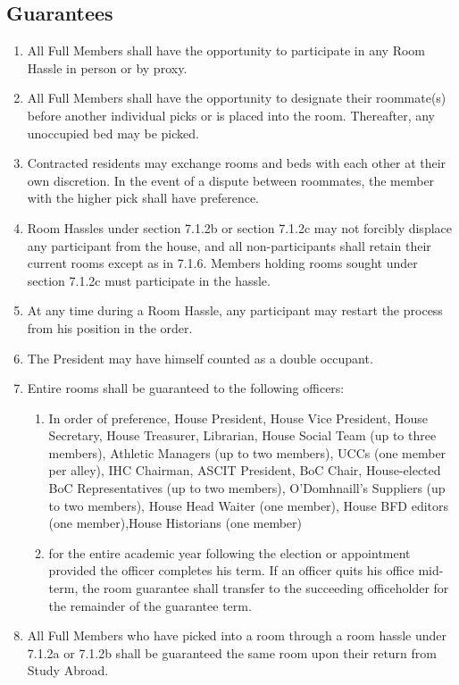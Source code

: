 \documentclass[10pt]{article} %
\begin{document}
\subsection{Guarantees}
\begin{enumerate}
\item All Full Members shall have the opportunity to participate in any Room Hassle in person or by proxy.
\item All Full Members shall have the opportunity to designate their roommate(s) before another individual picks or is placed into the room. Thereafter, any unoccupied bed may be picked.
\item Contracted residents may exchange rooms and beds with each other at their own discretion. In the event of a dispute between roommates, the member with the higher pick shall have preference.
\item Room Hassles under section 7.1.2b or section 7.1.2c may not forcibly displace any participant from the house, and all non-participants shall retain their current rooms except as in 7.1.6. Members holding rooms sought under section 7.1.2c must participate in the hassle.
\item At any time during a Room Hassle, any participant may restart the process from his position in the order.
\item The President may have himself counted as a double occupant.
\item Entire rooms shall be guaranteed to the following officers:
\begin{enumerate}
\item In order of preference, House President, House Vice President, House Secretary, House Treasurer, Librarian, House Social Team (up to three members), Athletic Managers (up to two members), UCCs (one member per alley), IHC Chairman, ASCIT President, BoC Chair, House-elected BoC Representatives (up to two members), O’Domhnaill’s Suppliers (up to two members), House Head Waiter (one member), House BFD editors (one member),House Historians (one member)
\item for the entire academic year following the election or appointment provided the officer completes his term. If an officer quits his office mid-term, the room guarantee shall transfer to the succeeding officeholder for the remainder of the guarantee term.
\end{enumerate}
\item All Full Members who have picked into a room through a room hassle under 7.1.2a or 7.1.2b shall be guaranteed the same room upon their return from Study Abroad.
\end{enumerate}
\end{document}
